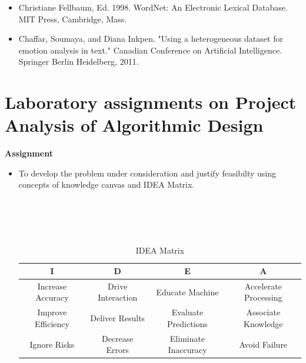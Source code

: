 \documentclass[oneside,a4paper,12pt]{book}
\begin{document}
\begin{appendices}
\begin{itemize}
	\item[\lbrack9\rbrack] Christiane Fellbaum, Ed. 1998. WordNet: An Electronic Lexical Database. MIT 	Press, Cambridge, Mass. 
	
	\item[\lbrack10\rbrack] Chaffar, Soumaya, and Diana Inkpen. "Using a heterogeneous dataset for 	emotion analysis in text." Canadian Conference on Artificial Intelligence. Springer 	Berlin Heidelberg, 2011.
\end{itemize}

\chapter{Laboratory assignments on Project Analysis of Algorithmic Design}
\begin{center}
	\textbf{Assignment}
\end{center}
\begin{itemize}
\item[] To develop the problem under consideration and justify feasibilty using
concepts of knowledge canvas and IDEA Matrix.\\\\\\\\\\


\begin{table}[!htbp]
\begin{center}
  \begin{tabular}{| c | c | c | c |}
\hline
 I & D & E & A \\ 
\hline
Increase Accuracy & Drive Interaction & Educate Machine & Accelerate Processing\\
\hline
Improve Efficiency & Deliver Results & Evaluate Predictions & Associate Knowledge \\
 \hline
Ignore Risks & Decrease Errors & Eliminate Inaccuracy & Avoid Failure\\
\hline
\end{tabular}
 \caption { IDEA Matrix }
 \label{tab:imatrix}
\end{center}
\end{table}
\end{itemize}



\end{appendices}
\end{document}
